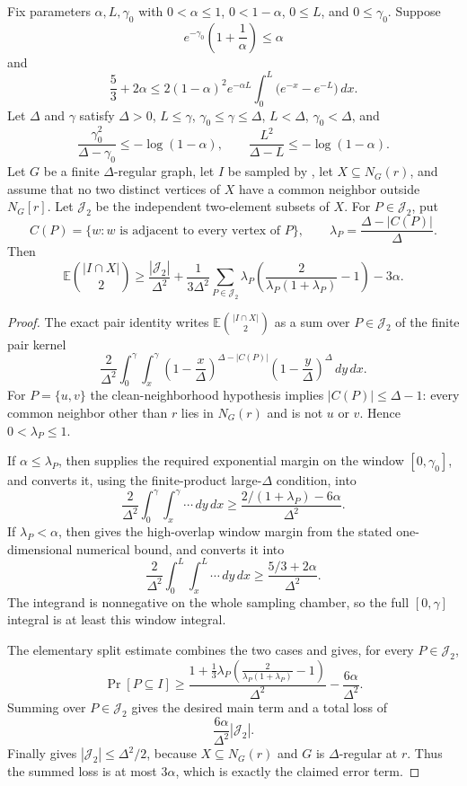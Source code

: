 \begin{helper}
Fix parameters $\alpha,L,\gamma_0$ with $0<\alpha\le1$, $0<1-\alpha$,
$0\le L$, and $0\le\gamma_0$.  Suppose
\[
e^{-\gamma_0}\left(1+\frac1\alpha\right)\le\alpha
\]
and
\[
\frac53+2\alpha\le
2(1-\alpha)^2e^{-\alpha L}
\int_0^L\bigl(e^{-x}-e^{-L}\bigr)\,dx .
\]
Let $\Delta$ and $\gamma$ satisfy $\Delta>0$, $L\le\gamma$,
$\gamma_0\le\gamma\le\Delta$, $L<\Delta$, $\gamma_0<\Delta$, and
\[
\frac{\gamma_0^2}{\Delta-\gamma_0}\le-\log(1-\alpha),
\qquad
\frac{L^2}{\Delta-L}\le-\log(1-\alpha).
\]
Let $G$ be a finite $\Delta$-regular graph, let $I$ be sampled by
, let $X\subseteq N_G(r)$, and assume
that no two distinct vertices of $X$ have a common neighbor outside
$N_G[r]$.  Let $\mathcal J_2$ be the independent two-element subsets of
$X$.  For $P\in\mathcal J_2$, put
\[
C(P)=\{w:\text{$w$ is adjacent to every vertex of $P$}\},
\qquad
\lambda_P=\frac{\Delta-|C(P)|}{\Delta}.
\]
Then
\[
\mathbb E\binom{|I\cap X|}{2}
\ge
\frac{|\mathcal J_2|}{\Delta^2}
+\frac1{3\Delta^2}\sum_{P\in\mathcal J_2}
\lambda_P\left(\frac{2}{\lambda_P(1+\lambda_P)}-1\right)
-3\alpha .
\]
\end{helper}
\begin{proof}
The exact pair identity  writes
$\mathbb E\binom{|I\cap X|}{2}$ as a sum over $P\in\mathcal J_2$ of the
finite pair kernel
\[
\frac{2}{\Delta^2}\int_0^\gamma\int_x^\gamma
\left(1-\frac{x}{\Delta}\right)^{\Delta-|C(P)|}
\left(1-\frac{y}{\Delta}\right)^\Delta\,dy\,dx .
\]
For $P=\{u,v\}$ the clean-neighborhood hypothesis implies
$|C(P)|\le\Delta-1$: every common neighbor other than $r$ lies in
$N_G(r)$ and is not $u$ or $v$.  Hence
$0<\lambda_P\le1$.

If $\alpha\le\lambda_P$, then
 supplies the
required exponential margin on the window $[0,\gamma_0]$, and
 converts it, using the
finite-product large-$\Delta$ condition, into
\[
\frac{2}{\Delta^2}\int_0^\gamma\int_x^\gamma\cdots\,dy\,dx
\ge
\frac{2/(1+\lambda_P)-6\alpha}{\Delta^2}.
\]
If $\lambda_P<\alpha$, then
 gives the
high-overlap window margin from the stated one-dimensional numerical
bound, and 
converts it into
\[
\frac{2}{\Delta^2}\int_0^L\int_x^L\cdots\,dy\,dx
\ge
\frac{5/3+2\alpha}{\Delta^2}.
\]
The integrand is nonnegative on the whole sampling chamber, so the full
$[0,\gamma]$ integral is at least this window integral.

The elementary split estimate 
combines the two cases and gives, for every $P\in\mathcal J_2$,
\[
\Pr[P\subseteq I]\ge
\frac{1+\frac13\lambda_P
\left(\frac{2}{\lambda_P(1+\lambda_P)}-1\right)}{\Delta^2}
-\frac{6\alpha}{\Delta^2}.
\]
Summing over $P\in\mathcal J_2$ gives the desired main term and a total
loss of
\[
\frac{6\alpha}{\Delta^2}|\mathcal J_2|.
\]
Finally  gives
$|\mathcal J_2|\le\Delta^2/2$, because $X\subseteq N_G(r)$ and $G$ is
$\Delta$-regular at $r$.  Thus the summed loss is at most $3\alpha$, which
is exactly the claimed error term.
\end{proof}
